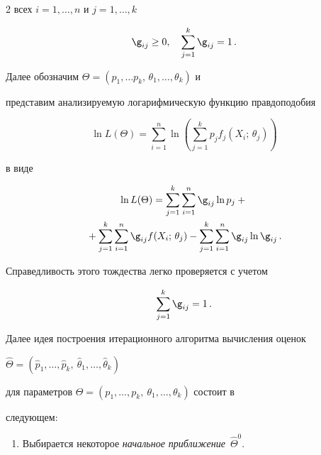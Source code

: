 \begin{multicols}{2}
всех $i=1,\ldots ,n$ и $j=1,\ldots ,k$


$$


\g_{ij} \geq 0,\quad \sum_{j=1}^k \g_{ij} =1\,.


$$








Далее обозначим $\Theta = (p_1,\ldots p_k,\,\theta_1,\ldots ,\theta_k )$ и


представим анализируемую логарифмическую функцию правдоподобия


$$


\ln L(\Theta ) = \sum\limits_{i=1}^n \ln \left (\sum\limits_{j=1}^k p_j f_j


(X_i;\,\theta_j )\right )


$$


в виде


\begin{multline}


\ln L (\Theta ) = \sum\limits_{j=1}^k\sum\limits_{i=1}^n \g_{ij} \ln p_j+{}\\


{}+\sum\limits_{j=1}^k\sum\limits_{i=1}^n \g_{ij} f(X_i;\,\theta_j)-


\sum\limits_{j=1}^k\sum\limits_{i=1}^n \g_{ij} \ln \g_{ij}\,.


\end{multline}





Справедливость этого тождества легко проверяется с учетом


$$


\sum\limits_{j=1}^k \g_{ij} =1\,.


$$





Далее идея построения итерационного алгоритма вычисления оценок


$\hat{\Theta} = (\hat{p}_1,\ldots , \hat{p}_k,\


\hat{\theta}_1,\ldots , \hat{\theta}_k)$


для параметров $\Theta = (p_1,\ldots , p_k,\ \theta_1,\ldots , \theta_k)$ состоит в


следующем:


\begin{enumerate}[1.]


\item Выбирается некоторое \textit{начальное приближение}~$\hat{\Theta}^0$.



\end{enumerate}
\end{multicols}

